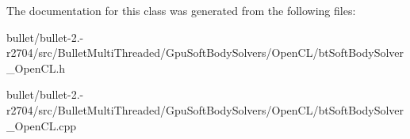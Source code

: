 The documentation for this class was generated from the following files\+:\begin{DoxyCompactItemize}
\item 
bullet/bullet-\/2.-\/r2704/src/\+Bullet\+Multi\+Threaded/\+Gpu\+Soft\+Body\+Solvers/\+Open\+C\+L/bt\+Soft\+Body\+Solver\+\_\+\+Open\+C\+L.\+h\item 
bullet/bullet-\/2.-\/r2704/src/\+Bullet\+Multi\+Threaded/\+Gpu\+Soft\+Body\+Solvers/\+Open\+C\+L/bt\+Soft\+Body\+Solver\+\_\+\+Open\+C\+L.\+cpp\end{DoxyCompactItemize}
